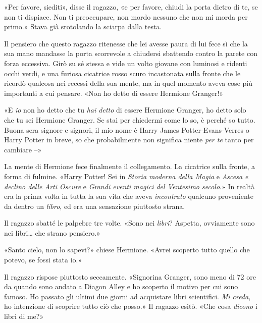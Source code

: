 «Per favore, siediti», disse il ragazzo, «e per favore, chiudi la porta dietro di te, se non ti dispiace. Non ti preoccupare, non mordo nessuno che non mi morda per primo.» Stava già srotolando la sciarpa dalla testa.

Il pensiero che questo ragazzo ritenesse che lei avesse paura di lui fece sì che la sua mano mandasse la porta scorrevole a chiudersi sbattendo contro la parete con forza eccessiva. Girò su sé stessa e vide un volto giovane con luminosi e ridenti occhi verdi, e una furiosa cicatrice rosso scuro incastonata sulla fronte che le ricordò qualcosa nei recessi della sua mente, ma in quel momento aveva cose più importanti a cui pensare. «Non ho detto di essere Hermione Granger!»

«E \textit{io} non ho detto che tu \textit{hai detto} di essere Hermione Granger, ho detto solo che tu sei Hermione Granger. Se stai per chiedermi come lo so, è perché so tutto. Buona sera signore e signori, il mio nome è Harry James Potter-Evans-Verres o Harry Potter in breve, so che probabilmente non significa niente \textit{per te} tanto per cambiare –»

La mente di Hermione fece finalmente il collegamento. La cicatrice sulla fronte, a forma di fulmine. «Harry Potter! Sei in \textit{Storia moderna della Magia} e \textit{Ascesa e declino delle Arti Oscure} e \textit{Grandi eventi magici del Ventesimo secolo}.» In realtà era la prima volta in tutta la sua vita che aveva \textit{incontrato} qualcuno proveniente da dentro un \textit{libro}, ed era una sensazione piuttosto strana.

Il ragazzo sbatté le palpebre tre volte. «Sono nei \textit{libri}? Aspetta, ovviamente sono nei libri… che strano pensiero.»

«Santo cielo, non lo sapevi?» chiese Hermione. «Avrei scoperto tutto quello che potevo, se fossi stata io.»

Il ragazzo rispose piuttosto seccamente. «Signorina Granger, sono meno di 72 ore da quando sono andato a Diagon Alley e ho scoperto il motivo per cui sono famoso. Ho passato gli ultimi due giorni ad acquistare libri scientifici. \textit{Mi creda}, ho intenzione di scoprire tutto ciò che posso.» Il ragazzo esitò. «Che cosa \textit{dicono} i libri di me?»

